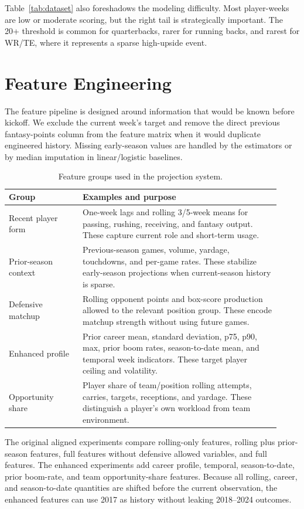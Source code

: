 \documentclass{article}
\begin{document}


Table~\ref{tab:dataset} also foreshadows the modeling difficulty. Most player-weeks are low or moderate scoring, but the right tail is strategically important. The 20+ threshold is common for quarterbacks, rarer for running backs, and rarest for WR/TE, where it represents a sparse high-upside event.

\section{Feature Engineering}
The feature pipeline is designed around information that would be known before kickoff. We exclude the current week's target and remove the direct previous fantasy-points column from the feature matrix when it would duplicate engineered history. Missing early-season values are handled by the estimators or by median imputation in linear/logistic baselines.

\begin{table}[!htbp]
\caption{Feature groups used in the projection system.}
\label{tab:features}
\centering
\footnotesize
\begin{tabular}{p{0.25\linewidth}p{0.67\linewidth}}
\toprule
Group & Examples and purpose \\
\midrule
Recent player form & One-week lags and rolling 3/5-week means for passing, rushing, receiving, and fantasy output. These capture current role and short-term usage. \\
Prior-season context & Previous-season games, volume, yardage, touchdowns, and per-game rates. These stabilize early-season projections when current-season history is sparse. \\
Defensive matchup & Rolling opponent points and box-score production allowed to the relevant position group. These encode matchup strength without using future games. \\
Enhanced profile & Prior career mean, standard deviation, p75, p90, max, prior boom rates, season-to-date mean, and temporal week indicators. These target player ceiling and volatility. \\
Opportunity share & Player share of team/position rolling attempts, carries, targets, receptions, and yardage. These distinguish a player's own workload from team environment. \\
\bottomrule
\end{tabular}
\end{table}

The original aligned experiments compare rolling-only features, rolling plus prior-season features, full features without defensive allowed variables, and full features. The enhanced experiments add career profile, temporal, season-to-date, prior boom-rate, and team opportunity-share features. Because all rolling, career, and season-to-date quantities are shifted before the current observation, the enhanced features can use 2017 as history without leaking 2018--2024 outcomes.
\end{document}
